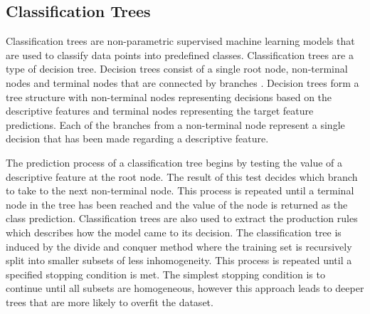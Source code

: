 \documentclass[conference]{IEEEtran}
\begin{document}
	\subsection{Classification Trees}
	Classification trees are non-parametric supervised machine learning models that are used to classify data points into predefined classes. Classification trees are a type of decision tree. Decision trees consist of a single root node, non-terminal nodes and terminal nodes that are connected by branches \cite{b1}. Decision trees form a tree structure with non-terminal nodes representing decisions based on the descriptive features and terminal nodes representing the target feature predictions. Each of the branches from a non-terminal node represent a single decision that has been made regarding a descriptive feature. 
	
	The prediction process of a classification tree begins by testing the value of a descriptive feature at the root node. The result of this test decides which branch to take to the next non-terminal node. This process is repeated until a terminal node in the tree has been reached and the value of the node is returned as the class prediction. Classification trees are also used to extract the production rules which describes how the model came to its decision. The classification tree is induced by the divide and conquer method where the training set is recursively split into smaller subsets of less inhomogeneity. This process is repeated until a specified stopping condition is met. The simplest stopping condition is to continue until all subsets are homogeneous, however this approach leads to deeper trees that are more likely to overfit the dataset. 
	
\end{document}
